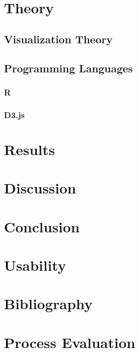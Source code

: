 \documentclass[a4paper,12pt]{article}
\begin{document}
\section{Theory} %

\subsection{Visualization Theory} %

\subsection{Programming Languages} %

\subsubsection{R}

\subsubsection{D3.js}

\section{Results}

\section{Discussion}

\section{Conclusion}

\section{Usability}

\section{Bibliography}

\section{Process Evaluation}
\end{document}
